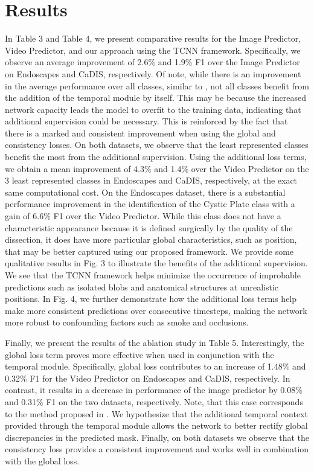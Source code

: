 \documentclass[twoside, print]{ieeecolor_arxiv}
\begin{document}
\section{Results}
In Table 3 and Table 4, we present comparative results for the Image Predictor, Video Predictor, and our approach using the TCNN framework. Specifically, we observe an average improvement of 2.6\% and 1.9\%  F1 over the Image Predictor on Endoscapes and CaDIS, respectively. Of note, while there is an improvement in the average performance over all classes, similar to \cite{pfeuffer} \cite{exploitingtemp}, not all classes benefit from the addition of the temporal module by itself. This may be because the increased network capacity leads the model to overfit to the training data, indicating that additional supervision could be necessary. This is reinforced by the fact that there is a marked and consistent improvement when using the global and consistency losses.  On both datasets, we observe that the least represented classes benefit the most from the additional supervision. Using the additional loss terms, we obtain a mean improvement of 4.3\% and 1.4\% over the Video Predictor on the 3 least represented classes in Endoscapes and CaDIS, respectively, at the exact same computational cost. On the Endoscapes dataset, there is a substantial performance improvement in the identification of the Cystic Plate class with a gain of 6.6\% F1 over the Video Predictor. While this class does not have a characteristic appearance because it is defined surgically by the quality of the dissection, it does have more particular global characteristics, such as position, that may be better captured using our proposed framework. We provide some qualitative results in Fig. 3 to illustrate the benefits of the additional supervision. We see that the TCNN framework helps minimize the occurrence of improbable predictions such as isolated blobs and anatomical structures at unrealistic positions.  In Fig. 4, we further demonstrate how the additional loss terms help make more consistent predictions over consecutive timesteps, making the network more robust to confounding factors such as smoke and occlusions.

Finally, we present the results of the ablation study in Table 5. Interestingly, the global loss term proves more effective when used in conjunction with the temporal module. Specifically, global loss contributes to an increase of 1.48\% and 0.32\% F1 for the Video Predictor on Endoscapes and CaDIS, respectively. In contrast, it results in a decrease in performance of the image predictor by 0.08\% and 0.31\% F1 on the two datasets, respectively. Note, that this case corresponds to the method proposed in \cite{acnn}. We hypothesize that the additional temporal context provided through the temporal module allows the network to better rectify global discrepancies in the predicted mask. Finally, on both datasets we observe that the consistency loss provides a consistent improvement and works well in combination with the global loss.  
\end{document}
